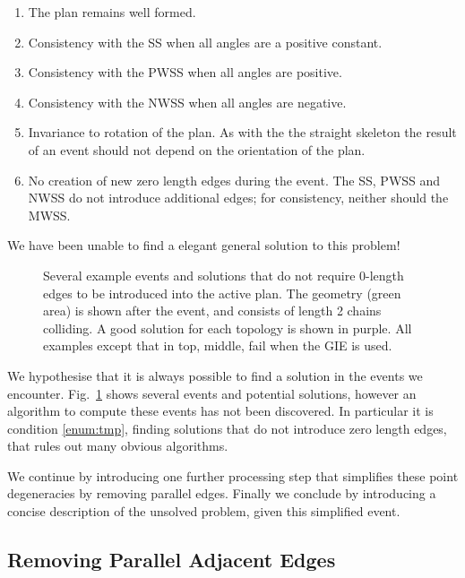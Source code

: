 \begin{enumerate}
\item{The plan remains well formed.}
\item{Consistency with the SS when all angles are a positive constant.}
\item{Consistency with the PWSS when all angles are positive.}
\item{Consistency with the NWSS when all angles are negative.}
\item{Invariance to rotation of the plan. As with the the straight skeleton the result of an event should not depend on the orientation of the plan.}
\item\label{enum:tmp}{No creation of new zero length edges during the event. The SS, PWSS and NWSS do not introduce additional edges; for consistency, neither should the MWSS.}
\end{enumerate}

We have been unable to find a elegant general solution to this problem!

\begin{figure}
  \centering
  \def\svgwidth{0.8\columnwidth}
  
  \caption[Manual examples of good MWSS solutions]{\label{fig:wss_hand_examples} Several example events and solutions that do not require 0-length edges to be introduced into the active plan. The geometry (green area) is shown after the event, and consists of length 2 chains colliding. A good solution for each topology is shown in purple. All examples except that in top, middle, fail when the GIE is used.}
\end{figure}

We hypothesise that it is always possible to find a solution in the events we encounter. Fig.~\ref{fig:wss_hand_examples} shows several events and potential solutions, however an algorithm to compute these events has not been discovered. In particular it is condition \ref{enum:tmp}, finding solutions that do not introduce zero length edges, that rules out many obvious algorithms.

We continue by introducing one further processing step that simplifies these point degeneracies by removing parallel edges. Finally we conclude by introducing a concise description of the unsolved problem, given this simplified event.

\subsection{Removing Parallel Adjacent Edges}


